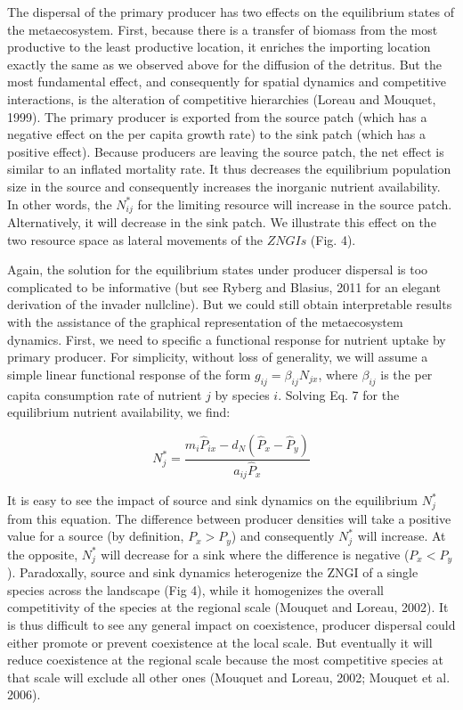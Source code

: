 \documentclass[letterpaper,twocolumn,showkeys]{revtex4-1}
\begin{document}
The dispersal of the primary producer has two effects on the equilibrium states of the metaecosystem. First, because there is a transfer of biomass from the most productive to the least productive location, it enriches the importing location exactly the same as we observed above for the diffusion of the detritus. But the most fundamental effect, and consequently for spatial dynamics and competitive interactions, is the alteration of competitive hierarchies (Loreau and Mouquet, 1999). The primary producer is exported from the source patch (which has a negative effect on the per capita growth rate) to the sink patch (which has a positive effect). Because producers are leaving the source patch, the net effect is similar to an inflated mortality rate. It thus decreases the equilibrium population size in the source and consequently increases the inorganic nutrient availability. In other words, the $N^*_{ij}$ for the limiting resource will increase in the source patch. Alternatively, it will decrease in the sink patch. We illustrate this effect on the two resource space as lateral movements of the $ZNGIs$ (Fig. 4).

Again, the solution for the equilibrium states under producer dispersal is too complicated to be informative (but see Ryberg and Blasius, 2011 for an elegant derivation of the invader nullcline). But we could still obtain interpretable results with the assistance of the graphical representation of the metaecosystem dynamics. First, we need to specific a functional response for nutrient uptake by primary producer. For simplicity, without loss of generality, we will assume a simple linear functional response of the form $g_{ij} = \beta_{ij}N_{jx}$, where $\beta_{ij}$ is the per capita consumption rate of nutrient $j$ by species $i$. Solving Eq. 7 for the equilibrium nutrient availability, we find:

\begin{equation}
	\label{e:bnet}
	N^{*}_{j}=\frac{m_{i}\widehat{P}_{ix}-d_{N}(\widehat{P}_{x}-\widehat{P}_{y})}{a_{ij}\widehat{P}_{x}}
\end{equation}

It is easy to see the impact of source and sink dynamics on the equilibrium $N^{*}_{j}$ from this equation. The difference between producer densities will take a positive value for a source (by definition, $P_x>P_y$) and consequently $N^{*}_{j}$ will increase. At the opposite, $N^{*}_{j}$ will decrease for a sink where the difference is negative ($P_x<P_y$). Paradoxally, source and sink dynamics heterogenize the ZNGI of a single species across the landscape (Fig 4), while it homogenizes the overall competitivity of the species at the regional scale (Mouquet and Loreau, 2002). It is thus difficult to see any general impact on coexistence, producer dispersal could either promote or prevent coexistence at the local scale. But eventually it will reduce coexistence at the regional scale because the most competitive species at that scale will exclude all other ones (Mouquet and Loreau, 2002; Mouquet et al. 2006).  
\end{document}
